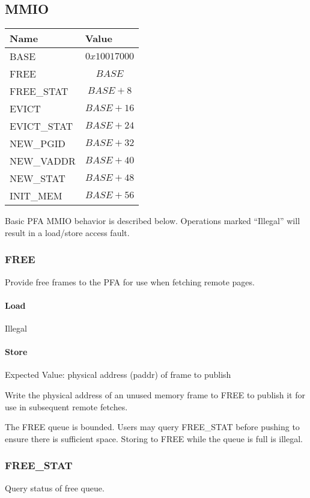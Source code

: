 \subsection{MMIO}
\begin{tabular} { | l l | }
\hline
Name & Value \\
\hline\hline
BASE        & $$0x10017000$$ \\
FREE        & $$BASE$$       \\
FREE\_STAT  & $$BASE + 8$$		\\
EVICT       & $$BASE + 16$$	\\
EVICT\_STAT & $$BASE + 24$$	\\
NEW\_PGID    & $$BASE + 32$$	\\
NEW\_VADDR  & $$BASE + 40$$	\\
NEW\_STAT   & $$BASE + 48$$	\\
INIT\_MEM   & $$BASE + 56$$	\\
\hline
\end{tabular}

\vspace{+5mm}
Basic PFA MMIO behavior is described below. Operations marked ``Illegal'' will
result in a load/store access fault.

\subsubsection{FREE}
Provide free frames to the PFA for use when fetching remote pages.

\paragraph{Load}
Illegal

\paragraph{Store}
Expected Value: physical address (paddr) of frame to publish

Write the physical address of an unused memory frame to FREE to publish it for
use in subsequent remote fetches.

The FREE queue is bounded. Users may query FREE\_STAT before pushing to ensure
there is sufficient space. Storing to FREE while the queue is full is illegal.

\subsubsection{FREE\_STAT}
Query status of free queue.

